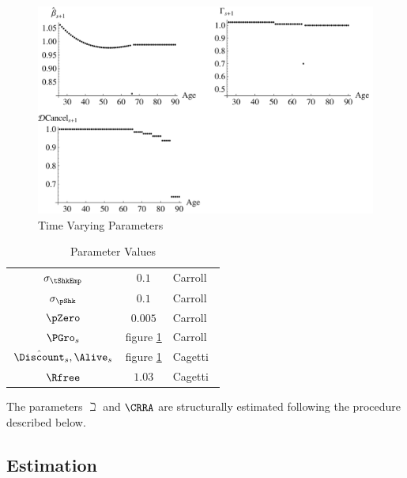\documentclass[titlepage]{\econtex}
\begin{document}
  \hypertarget{PlotTimeVaryingParam}{}
  \begin{figure}[h]
    \includegraphics{./Figures/PlotTimeVaryingParam}
    \caption{Time Varying Parameters}
    \label{fig:TimeVaryingParam}
  \end{figure}

  \begin{table}[h]
    \caption{Parameter Values}\label{table:StrEstParams}
    \begin{center}
      \begin{tabular}{ccl}
        \hline\hline
        $\sigma _{\tShkEmp}$    & $0.1$ & Carroll~\citeyearpar{carroll:brookings}
        \\ $\sigma _{\pShk}$   & $0.1$ & Carroll~\citeyearpar{carroll:brookings}
        \\ $\pZero$           & $0.005$  & Carroll~\citeyearpar{carroll:brookings}
        \\ $\PGro_{s}$        & figure \ref{fig:TimeVaryingParam} & Carroll~\citeyearpar{carrollBSLCPIH}
        \\ $\hat{\Discount}_{s},\Alive_{s}$ & figure \ref{fig:TimeVaryingParam} & Cagetti~\citeyearpar{cagettiWprofiles}
        \\$\Rfree$            & $1.03$  & Cagetti~\citeyearpar{cagettiWprofiles}\\
        \hline
      \end{tabular}
    \end{center}
  \end{table}

  The parameters ${\beth}$ and $\CRRA$ are structurally estimated following the procedure described below.

  \subsection{Estimation}
\end{document}
